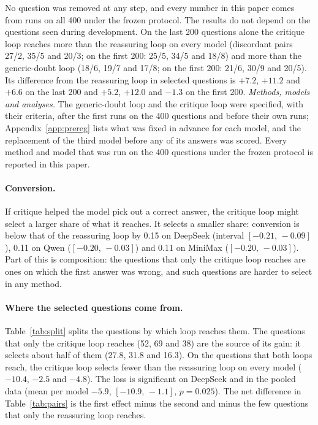 \documentclass[11pt]{article}
\newcommand{\ds}{DeepSeek}
\newcommand{\qw}{Qwen}
\newcommand{\mm}{MiniMax}
\newcommand{\ci}[2]{$[#1,\,#2]$}
\begin{document}
No question was removed at any step, and every number in this paper comes from runs on all 400 under the frozen protocol.
The results do not depend on the questions seen during development.
On the last 200 questions alone the critique loop reaches more than the reassuring loop on every model (discordant pairs 27/2, 35/5 and 20/3; on the first 200: 25/5, 34/5 and 18/8) and more than the generic-doubt loop (18/6, 19/7 and 17/8; on the first 200: 21/6, 30/9 and 20/5).
Its difference from the reassuring loop in selected questions is $+7.2$, $+11.2$ and $+6.6$ on the last 200 and $+5.2$, $+12.0$ and $-1.3$ on the first 200.
\emph{Methods, models and analyses.}
The generic-doubt loop and the critique loop were specified, with their criteria, after the first runs on the 400 questions and before their own runs; Appendix~\ref{app:prereg} lists what was fixed in advance for each model, and the replacement of the third model before any of its answers was scored.
Every method and model that was run on the 400 questions under the frozen protocol is reported in this paper.

\paragraph{Conversion.}
If critique helped the model pick out a correct answer, the critique loop might select a larger share of what it reaches.
It selects a smaller share: conversion is below that of the reassuring loop by 0.15 on \ds{} (interval \ci{-0.21}{-0.09}), 0.11 on \qw{} (\ci{-0.20}{-0.03}) and 0.11 on \mm{} (\ci{-0.20}{-0.03}).
Part of this is composition: the questions that only the critique loop reaches are ones on which the first answer was wrong, and such questions are harder to select in any method.

\paragraph{Where the selected questions come from.}
Table~\ref{tab:split} splits the questions by which loop reaches them.
The questions that only the critique loop reaches (52, 69 and 38) are the source of its gain: it selects about half of them (27.8, 31.8 and 16.3).
On the questions that both loops reach, the critique loop selects fewer than the reassuring loop on every model ($-10.4$, $-2.5$ and $-4.8$).
The loss is significant on \ds{} and in the pooled data (mean per model $-5.9$, \ci{-10.9}{-1.1}, $p=0.025$).
The net difference in Table~\ref{tab:pairs} is the first effect minus the second and minus the few questions that only the reassuring loop reaches.
\end{document}
